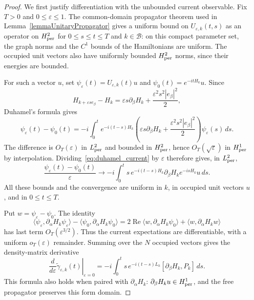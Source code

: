 \documentclass[a4paper,11pt]{article}
\theoremstyle{plain}
\theoremstyle{remark}
\def\eps{{\varepsilon}}
\begin{document}
\begin{proof}
We first justify differentiation with the unbounded current observable.
Fix $T>0$ and $0\le\eps\le1$. The common-domain propagator theorem used
in Lemma~\ref{lemmaUnitaryPropagator} gives a uniform bound on
$U_{\eps,k}(t,s)$ as an operator on $H^2_{\rm per}$ for
$0\le s\le t\le T$ and $k\in\mathcal B$: on this compact parameter
set, the graph norms and the $C^1$ bounds of the Hamiltonians are uniform.
The occupied unit vectors also have uniformly bounded $H^2_{\rm per}$
norms, since their energies are bounded.

For such a vector $u$, set
$\psi_\eps(t)=U_{\eps,k}(t)u$ and $\psi_0(t)=e^{-itH_k}u$.
Since
\[
H_{k+\eps se_\beta}-H_k
=\eps s\partial_\beta H_k+\frac{\eps^2s^2|e_\beta|^2}{2},
\]
Duhamel's formula gives
\begin{equation}\label{eq:duhamel_current}
\psi_\eps(t)-\psi_0(t)
=-i\int_0^t e^{-i(t-s)H_k}
\left(\eps s\partial_\beta H_k+\frac{\eps^2s^2|e_\beta|^2}{2}\right)
\psi_\eps(s)\,ds.
\end{equation}
The difference is $O_T(\eps)$ in $L^2_{\rm per}$ and bounded in
$H^2_{\rm per}$, hence $O_T(\sqrt\eps)$ in $H^1_{\rm per}$ by
interpolation. Dividing~\eqref{eq:duhamel_current} by $\eps$ therefore
gives, in $L^2_{\rm per}$,
\[
\frac{\psi_\eps(t)-\psi_0(t)}{\eps}
\longrightarrow-i\int_0^t s\,e^{-i(t-s)H_k}
\partial_\beta H_ke^{-isH_k}u\,ds.
\]
All these bounds and the convergence are uniform in $k$, in occupied
unit vectors $u$, and in $0\le t\le T$.

Put $w=\psi_\eps-\psi_0$. The identity
\[
\langle\psi_\eps,\partial_\alpha H_k\psi_\eps\rangle
-\langle\psi_0,\partial_\alpha H_k\psi_0\rangle
=2\operatorname{Re}\langle w,\partial_\alpha H_k\psi_0\rangle
+\langle w,\partial_\alpha H_kw\rangle
\]
has last term $O_T(\eps^{3/2})$. Thus the current expectations are
differentiable, with a uniform $o_T(\eps)$ remainder. Summing over the
$N$ occupied vectors gives the density-matrix derivative
\begin{equation}\label{eq:density_derivative}
\left.\frac{d}{d\eps}\widetilde\gamma_{\eps,k}(t)\right|_{\eps=0}
=-i\int_0^t s\,e^{-i(t-s)L_k}[\partial_\beta H_k,P_k]\,ds.
\end{equation}
This formula also holds when paired with $\partial_\alpha H_k$:
$\partial_\beta H_ku\in H^1_{\rm per}$, and the free propagator
preserves this form domain.


\end{proof}
\end{document}
